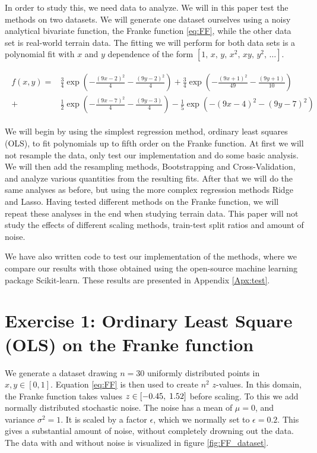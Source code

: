 \documentclass[reprint,english,notitlepage,aps,nobalancelastpage,nofootinbib]{revtex4-1}  %
\begin{document}
In order to study this, we need data to analyze. We will in this paper test the methods on two datasets. We will generate one dataset ourselves using a noisy analytical bivariate function, the Franke function \eqref{eq:FF}, while the other data set is real-world terrain data. The fitting we will perform for both data sets is a polynomial fit with $x$ and $y$ dependence of the form $[1,\,x,\,y,\,x^2,\,xy,\,y^2,\,\dots]$.

\begin{align}
	\begin{split}\label{eq:FF}
		f(x,y) = &\frac{3}{4}\exp(-\frac{(9x -2)^2}{4} - \frac{(9y-2)^2}{4}) + \frac{3}{4}\exp(-\frac{(9x + 1)^2}{49} - \frac{(9y + 1)}{10})
		\\
		+ &\frac{1}{2}\exp(-\frac{(9x-7)^2}{4} - \frac{(9y -3)}{4}) - \frac{1}{5}\exp(-(9x-4)^2 - (9y-7)^2)
	\end{split}
\end{align}

We will begin by using the simplest regression method, ordinary least squares (OLS), to fit polynomials up to fifth order on the Franke function. At first we will not resample the data, only test our implementation and do some basic analysis. We will then add the resampling methods, Bootstrapping and Cross-Validation, and analyze various quantities from the resulting fits. After that we will do the same analyses as before, but using the more complex regression methods Ridge and Lasso. Having tested different methods on the Franke function, we will repeat these analyses in the end when studying terrain data. This paper will not study the effects of different scaling methods, train-test split ratios and amount of noise.

We have also written code to test our implementation of the methods, where we compare our results with those obtained using the open-source machine learning package Scikit-learn. These results are presented in Appendix \ref{Apx:test}.

\section*{Exercise 1: Ordinary Least Square (OLS) on the Franke function}

We generate a dataset drawing $n=30$ uniformly distributed points in $x, y \in[0, 1]$. Equation \eqref{eq:FF} is then used to create $n^2$ \(z\)-values. In this domain, the Franke function takes values \(z\in[-0.45, \hspace{1mm} 1.52]\) before scaling. To this we add normally distributed stochastic noise. The noise has a mean of $\mu=0$, and variance $\sigma^2=1$. It is scaled by a factor $\epsilon$, which we normally set to $\epsilon=0.2$. This gives a substantial amount of noise, without completely drowning out the data. The data with and without noise is visualized in figure \ref{fig:FF_dataset}.
\end{document}
